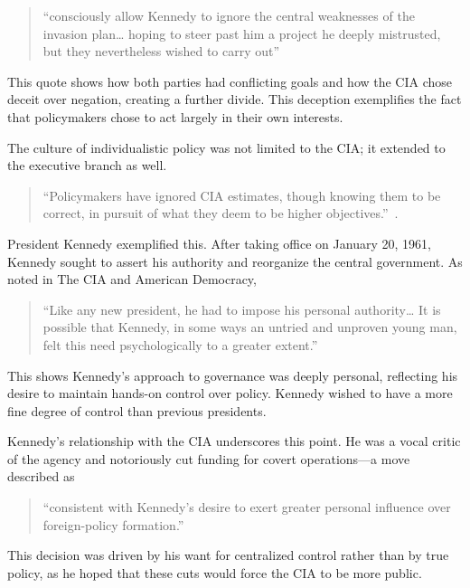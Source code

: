 \documentclass{article}
\begin{document}
    \begin{quotation}
        ``consciously allow Kennedy to ignore the central weaknesses of the invasion plan… hoping to steer past him a project he deeply mistrusted, but they nevertheless wished to carry out'' \parencite{Vandenbroucke1984} 
    \end{quotation}
    
    This quote shows how both parties had conflicting goals and how the CIA chose deceit over negation, creating a further divide. This deception exemplifies the fact that policymakers chose to act largely in their own interests.

    The culture of individualistic policy was not limited to the CIA; it extended to the executive branch as well. 

    \begin{quote}
        ``Policymakers have ignored CIA estimates, though knowing them to be correct, in pursuit of what they deem to be higher objectives.''~\parencite{JeffreysJones2003}.
    \end{quote}
    
    President Kennedy exemplified this. After taking office on January 20, 1961, Kennedy sought to assert his authority and reorganize the central government. As noted in The CIA and American Democracy, 

    \begin{quotation}
        ``Like any new president, he had to impose his personal authority… It is possible that Kennedy, in some ways an untried and unproven young man, felt this need psychologically to a greater extent.''~\parencite{JeffreysJones2003}
    \end{quotation}  

    This shows Kennedy's approach to governance was deeply personal, reflecting his desire to maintain hands-on control over policy. Kennedy wished to have a more fine degree of control than previous presidents.

    Kennedy's relationship with the CIA underscores this point. He was a vocal critic of the agency and notoriously cut funding for covert operations—a move described as 
    
    \begin{quotation}
        ``consistent with Kennedy's desire to exert greater personal influence over foreign-policy formation.''~\parencite{JeffreysJones2003}
    \end{quotation}

    This decision was driven by his want for centralized control rather than by true policy, as he hoped that these cuts would force the CIA to be more public.
\end{document}
